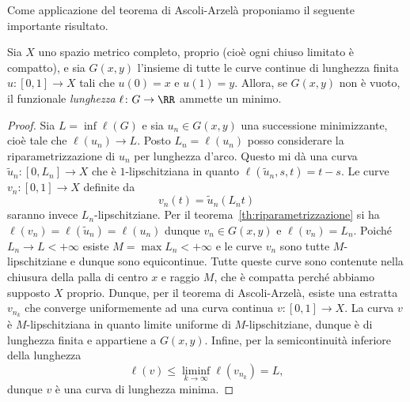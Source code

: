 Come applicazione del teorema di Ascoli-Arzelà
proponiamo il seguente importante risultato.

\begin{theorem}
    Sia $X$ uno spazio metrico completo, proprio 
    (cioè ogni chiuso limitato è compatto), 
    e sia $G(x,y)$ l'insieme di tutte le curve continue di lunghezza finita 
    $u\colon [0,1] \to X$
    tali che $u(0) = x$ e $u(1) = y$.
    Allora, se $G(x,y)$ non è vuoto, il funzionale \emph{lunghezza}
    $\ell\colon G \to \RR$ ammette un minimo.
\end{theorem}
\begin{proof}
    Sia $L = \inf\ell(G)$ e sia 
    $u_n\in G(x,y)$ una successione minimizzante,
    cioè tale che $\ell(u_n) \to L$.
    Posto $L_n = \ell(u_n)$ posso considerare la riparametrizzazione 
    di $u_n$ per lunghezza d'arco. 
    Questo mi dà una curva $\tilde u_n \colon [0,L_n] \to X$
    che è $1$-lipschitziana in quanto 
    $\ell(\tilde u_n, s,t) = t-s$.
    Le curve $v_n \colon [0,1] \to X$ definite da
    \[
        v_n(t) = \tilde u_n (L_n t)
    \]
    saranno invece $L_n$-lipschitziane. 
    Per il teorema~\ref{th:riparametrizzazione} si ha $\ell(v_n) = \ell(\tilde u_n) = \ell(u_n)$
    dunque $v_n\in G(x,y)$ e $\ell(v_n) = L_n$.
    Poiché $L_n\to L<+\infty$ esiste $M = \max L_n < +\infty$ 
    e le curve $v_n$ sono tutte $M$-lipschitziane e dunque 
    sono equicontinue. 
    Tutte queste curve sono contenute nella chiusura della 
    palla di centro $x$ e raggio $M$, che è compatta
    perché abbiamo supposto $X$ proprio.
    Dunque, per il teorema di Ascoli-Arzelà, esiste una estratta 
    $v_{n_k}$ che converge uniformemente ad una curva continua
    $v\colon [0,1] \to X$.
    La curva $v$ è $M$-lipschitziana in quanto limite uniforme di 
    $M$-lipschitziane, dunque è di lunghezza finita e 
    appartiene a $G(x,y)$.
    Infine, per la semicontinuità inferiore della lunghezza
    \[
        \ell(v) \le \liminf_{k\to \infty} \ell(v_{n_k}) = L,
    \]
    dunque $v$ è una curva di lunghezza minima.
\end{proof}

